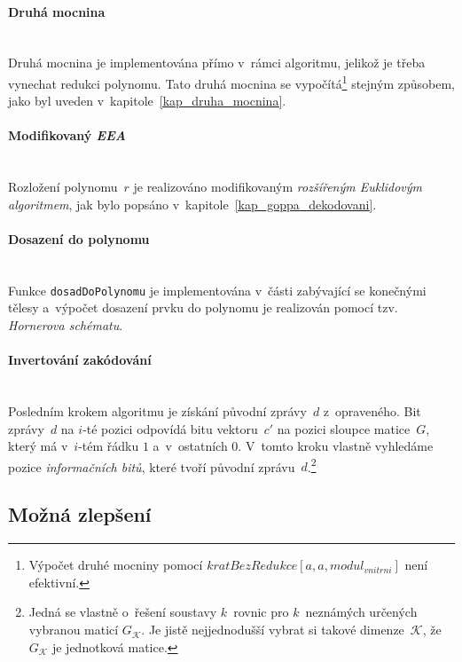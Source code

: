 \documentclass[thesis=M,czech,hidelinks]{FITthesis}[2012/06/26]
\newcommand{\0}{{\textcolor[gray]{0.75}{0}}}
\begin{document}
\paragraph{Druhá mocnina} \hfil \\
Druhá mocnina je implementována přímo v~rámci algoritmu, jelikož je třeba
vynechat redukci polynomu. Tato druhá mocnina se vypočítá\footnote{
    Výpočet druhé mocniny pomocí $ kratBezRedukce[ a, a, modul_{vnitrni} ] $ není
    efektivní.
} stejným způsobem, jako byl uveden v~kapitole~\ref{kap_druha_mocnina}.


\paragraph{Modifikovaný \emph{EEA}} \hfil \\
Rozložení polynomu~$r$ je realizováno modifikovaným \emph{rozšířeným Euklidovým
algoritmem}, jak bylo popsáno v~kapitole~\ref{kap_goppa_dekodovani}.


\paragraph{Dosazení do polynomu} \hfil \\
Funkce \texttt{dosadDoPolynomu} je implementována v~části zabývající se
konečnými tělesy a~výpočet dosazení prvku do polynomu je realizován pomocí tzv.
\emph{Hornerova schématu}.

\vfil

\paragraph{Invertování zakódování} \hfil \\
Posledním krokem algoritmu je získání původní zprávy~$d$ z~opraveného.
Bit zprávy~$d$ na $i$-té pozici odpovídá bitu vektoru~$c'$ na pozici sloupce
matice~$G$, který má v~$i$-tém řádku $1$ a~v~ostatních $0$. V~tomto kroku
vlastně vyhledáme pozice \emph{informačních bitů}, které tvoří původní
zprávu~$d$.\footnote{
    Jedná se vlastně o~řešení soustavy $k$~rovnic pro $k$~neznámých určených
    vybranou maticí $G_\mathcal{K}$. Je jistě nejjednodušší vybrat si takové
    dimenze~$\mathcal{K}$, že~$G_\mathcal{K}$ je jednotková matice.
}


\subsection{Možná zlepšení}
\end{document}

